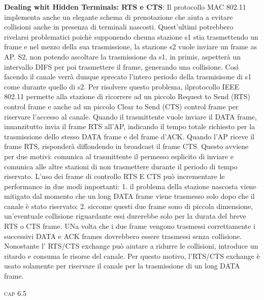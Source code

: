 \documentclass[a4paper,10pt]{article} %
\renewcommand{\b}[1]{%
    {\textbf{#1}}}
\begin{document}
\b{Dealing whit Hidden Terminals: RTS e CTS}: Il protocollo MAC 802.11 implementa anche un elegante schema di prenotazione che aiuta a evitare collisioni anche in presenza di terminali nascosti. Quest'ultimi potrebbero rivelarsi problematici poichè supponendo cheuna stazione s1 stia trasmettendo un frame e nel mezzo della sua trasmissione, la stazione s2 vuole inviare un frame as AP. S2, non potendo ascoltare la trasmissione da s1, in primis, aspetterà un intervallo DIFS  per poi trasmettere il frame, generando una collisione. Così facendo il canale verrà dunque sprecato l'intero periodo della trasmisisone di s1 come durante quello di s2. Per risolvere questo problema, ilprotocollo IEEE 802.11 permette alla stazione di ricorrere ad un piccolo Request to Send (RTS) control frame e anche ad un piccolo Clear to Send (CTS) control frame per riservare l'accesso al canale.
Quando il trasmittente vuole inviare il DATA frame, innanzitutto invia il frame RTS all'AP,
indicando il tempo totale richiesto per la trasmissione dello stesso DATA frame e del frame d'ACK. Quando l'AP riceve il frame RTS, risponderà diffondendo in broadcast il frame CTS.
Questo avviene per due motivi: comunica al trasmittente il permesso esplicito di inviare e comunica alle altre stazioni di non trasmettere durante il periodo di tempo riservato.
L'uso dei frame di controllo RTS E CTS può incrementare le performance in due modi importanti: 1. il problema della stazione nascosta viene mitigato dal momento che un long DATA frame viene trasmesso solo dopo che il canale è stato riservato; 2. siccome questi due frame sono di piccola dimensione, un'eventuale collisione riguardante essi durerebbe solo per la durata del breve RTS o CTS frame. UNa volta che i due frame vengono trasmessi correttamente i successivi DATA  e ACK frames dovrebbero essere trasmessi senza collisione.
Nonostante l' RTS/CTS exchange può aiutare a ridurre le collisioni, introduce un ritardo e consuma le risorse del canale. Per questo motivo, l'RTS/CTS exchange è usato solamente per riservare il canale per la trasmissione di un long DATA frame.  

\newpage
\vspace{3pt}
\centerline{\textsc{ \normalsize {cap 6.5}}}
\vspace{3pt}
\end{document}
